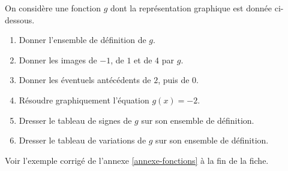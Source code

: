 \documentclass[10pt,a4paper]{article}
\begin{document}

\begin{bloc}
\begin{exo}
On considère une fonction \(g\) dont la représentation graphique est donnée ci-dessous.

\smallskip
\begin{minipage}{0.55\linewidth}
\centering
{}
\end{minipage}\hfill
\begin{minipage}{0.42\linewidth}
\begin{enumerate}[leftmargin=*]
    \item Donner l'ensemble de définition de \(g\).
    \item Donner les images de \(-1\), de \(1\) et de \(4\) par \(g\).
    \item Donner les éventuels antécédents de \(2\), puis de \(0\).
    \item Résoudre graphiquement l'équation \(g(x)=-2\).
    \item Dresser le tableau de signes de \(g\) sur son ensemble de définition.
    \item Dresser le tableau de variations de \(g\) sur son ensemble de définition.
\end{enumerate}
\end{minipage}
\end{exo}

\begin{indication}
    Voir l'exemple corrigé de l'annexe \ref{annexe-fonctions} à la fin de la fiche.
\end{indication}
\end{bloc}
\end{document}
